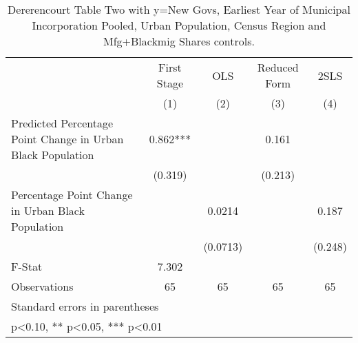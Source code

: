 \begin{table}[htbp]\centering
\def\sym#1{\ifmmode^{#1}\else\(^{#1}\)\fi}
\caption{Dererencourt Table Two with y=New Govs, Earliest Year of Municipal Incorporation  Pooled, Urban Population, Census Region and Mfg+Blackmig Shares controls.}
\begin{tabular}{l*{4}{c}}
\toprule
                    & First Stage   &         OLS   &Reduced Form   &        2SLS   \\
                    &\multicolumn{1}{c}{(1)}   &\multicolumn{1}{c}{(2)}   &\multicolumn{1}{c}{(3)}   &\multicolumn{1}{c}{(4)}   \\
\midrule
Predicted Percentage Point Change in Urban Black Population&       0.862***&               &       0.161   &               \\
                    &     (0.319)   &               &     (0.213)   &               \\
\addlinespace
Percentage Point Change in Urban Black Population&               &      0.0214   &               &       0.187   \\
                    &               &    (0.0713)   &               &     (0.248)   \\
\midrule
F-Stat              &       7.302   &               &               &               \\
Observations        &          65   &          65   &          65   &          65   \\
\bottomrule
\multicolumn{5}{l}{\footnotesize Standard errors in parentheses}\\
\multicolumn{5}{l}{\footnotesize * p<0.10, ** p<0.05, *** p<0.01}\\
\end{tabular}
\end{table}
